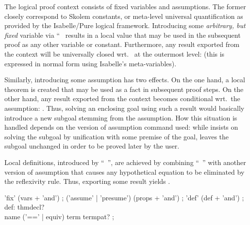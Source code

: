 \begin{isabellebody}
\begin{isamarkuptext}
  The logical proof context consists of fixed variables and
  assumptions.  The former closely correspond to Skolem constants, or
  meta-level universal quantification as provided by the Isabelle/Pure
  logical framework.  Introducing some \emph{arbitrary, but fixed}
  variable via ``~ results in a local value
  that may be used in the subsequent proof as any other variable or
  constant.  Furthermore, any result  exported from
  the context will be universally closed wrt.\  at the
  outermost level:  (this is expressed in normal
  form using Isabelle's meta-variables).

  Similarly, introducing some assumption \isa{{\isasymchi}} has two effects.
  On the one hand, a local theorem is created that may be used as a
  fact in subsequent proof steps.  On the other hand, any result
  \isa{{\isasymchi}\ {\isasymturnstile}\ {\isasymphi}} exported from the context becomes conditional wrt.\
  the assumption: \isa{{\isasymturnstile}\ {\isasymchi}\ {\isasymLongrightarrow}\ {\isasymphi}}.  Thus, solving an enclosing goal
  using such a result would basically introduce a new subgoal stemming
  from the assumption.  How this situation is handled depends on the
  version of assumption command used: while \isa{\isacommand{assume}}
  insists on solving the subgoal by unification with some premise of
  the goal, \isa{\isacommand{presume}} leaves the subgoal unchanged in order
  to be proved later by the user.

  Local definitions, introduced by ``~'', are achieved by combining ``~'' with
  another version of assumption that causes any hypothetical equation
  \isa{x\ {\isasymequiv}\ t} to be eliminated by the reflexivity rule.  Thus,
  exporting some result  yields .


  \begin{rail}
    'fix' (vars + 'and')
    ;
    ('assume' | 'presume') (props + 'and')
    ;
    'def' (def + 'and')
    ;
    def: thmdecl? \\ name ('==' | equiv) term termpat?
    ;
  \end{rail}


\end{isamarkuptext}
\end{isabellebody}
